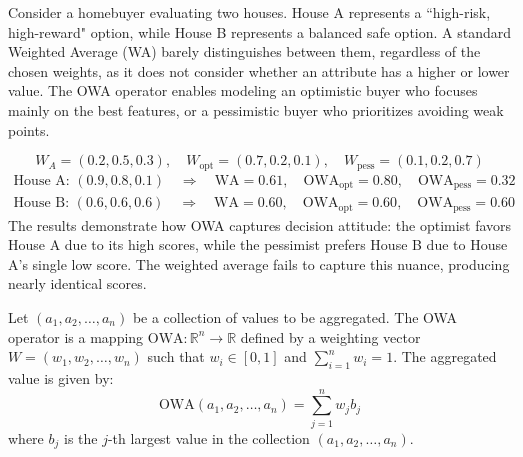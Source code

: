 \begin{example}\label{ex:why_owa}
    Consider a homebuyer evaluating two houses. House A represents a ``high-risk, high-reward" option, while House B represents a balanced safe option. A standard Weighted Average (WA) barely distinguishes between them, regardless of the chosen weights, as it does not consider whether an attribute has a higher or lower value. The OWA operator enables modeling an optimistic buyer who focuses mainly on the best features, or a pessimistic buyer who prioritizes avoiding weak points.

    \[W_A = (0.2, 0.5, 0.3), \quad W_{\text{opt}} = (0.7, 0.2, 0.1), \quad W_{\text{pess}} = (0.1, 0.2, 0.7) \]
    \begin{align*} 
    \text{House A: } (0.9, 0.8, 0.1)\quad  \Rightarrow \quad \text{WA} = 0.61,\quad  \text{OWA}_{\text{opt}} = 0.80, \quad  \text{OWA}_{\text{pess}} = 0.32 \\
    \text{House B: } (0.6, 0.6, 0.6) \quad \Rightarrow \quad \text{WA} = 0.60,\quad   \text{OWA}_{\text{opt}} = 0.60,  \quad \text{OWA}_{\text{pess}} = 0.60
    \end{align*}
    The results demonstrate how OWA captures decision attitude: the optimist favors House A due to its high scores, while the pessimist prefers House B due to House A's single low score. The weighted average fails to capture this nuance, producing nearly identical scores.
\end{example}

\begin{definition}
Let $(a_1, a_2, \dots, a_n)$ be a collection of values to be aggregated. The OWA operator is a mapping $\text{OWA}: \mathbb{R}^n \to \mathbb{R}$ defined by a weighting vector $W = (w_1, w_2, \dots, w_n)$ such that $w_i \in [0, 1]$ and $\sum_{i=1}^{n} w_i = 1$. The aggregated value is given by:
\[
\text{OWA}(a_1, a_2, \dots, a_n) = \sum_{j=1}^{n} w_j b_j
\]
where $b_j$ is the $j$-th largest value in the collection $(a_1, a_2, \dots, a_n)$.
\end{definition}

